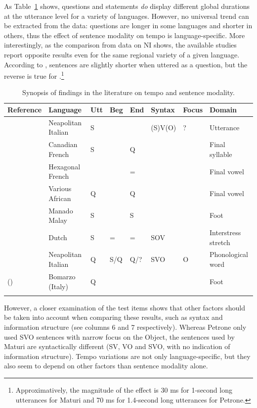 As Table~\ref{tab41} shows, questions and statements \textit{do} display different global durations at the utterance level for a variety of languages. However, no universal trend can be extracted from the data: questions are longer in some languages and shorter in others, thus the effect of sentence modality on tempo is language-specific. More interestingly, as the comparison from data on NI shows, the available studies report opposite results even for the same regional variety of a given language. According to \citet[table 6]{maturi1988intonazione}, sentences are slightly shorter when uttered as a question, but the reverse is true for \citet[163]{petrone2008role}.\footnote{Approximatively, the magnitude of the effect is 30 ms for 1-second long utterances for Maturi and 70 ms for 1.4-second long utterances for Petrone.} 

\begin{table}
\centering\small
\begin{tabular}{m{2.7cm} m{1.4cm} l l l l l m{1.7cm}}
\mytoprule
Reference & Language & Utt & Beg & End & Syntax & Focus & Domain \\
\midrule
\citet{maturi1988intonazione} & Neapolitan Italian & S & & & (S)V(O) & ? & Utterance\\[.3em]
\citet{ryalls1994effects} & Canadian French& S & & Q & & & Final syllable\\[.3em]
\citet{smith2002prosodic} & Hexagonal French & & & = & & & Final vowel \\[.3em]
\citet{rialland2007question} & Various African & Q & & Q & & & Final vowel\\[.3em]
\citet{vanheuven2005speech} & Manado Malay & S & & S & & & Foot \\[.4em]
 & Dutch & S & = & = & SOV & & Interstress stretch \\[.3em]
\citet{petrone2008role} & Neapolitan Italian & Q & S/Q & Q/? & SVO & O & Phonological word\\[.3em]
\mbox{\citeauthor{dedominicis2010interrogative}} (\citeyear{dedominicis2010interrogative}) & Bomarzo (Italy)& Q & & & & & Foot \\[.3em]
\mybottomrule
\end{tabular}
\caption{Synopsis of findings in the literature on tempo and sentence modality.}
\label{tab41}\end{table}

However, a closer examination of the test items shows that other factors should be taken into account when comparing these results, such as syntax and information structure (see columns 6 and 7 respectively). Whereas Petrone only used SVO sentences with narrow focus on the Object, the sentences used by Maturi are syntactically different (SV, VO and SVO, with no indication of information structure). Tempo variations are not only language-specific, but they also seem to depend on other factors than sentence modality alone. 

